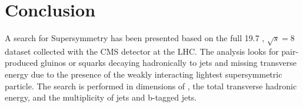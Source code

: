\chapter{Conclusion}
\label{ch:conclusion}

\ifpdf
    \graphicspath{{Chapter10/Figs/Raster/}{Chapter10/Figs/PDF/}{Chapter10/Figs/}}
\else
    \graphicspath{{Chapter10/Figs/Vector/}{Chapter10/Figs/}}
\fi
















A search for Supersymmetry has been presented based on the full 19.7 \fb, 
$\sqrt{s} = 8$ \tev dataset collected with the CMS detector at the LHC. The
analysis looks for pair-produced gluinos or squarks decaying hadronically to
jets and missing transverse energy due to the presence of the weakly interacting
lightest supersymmetric particle. The search is performed in dimensions of \HT,
the total transverse hadronic energy, and the multiplicity of jets and b-tagged
jets.

